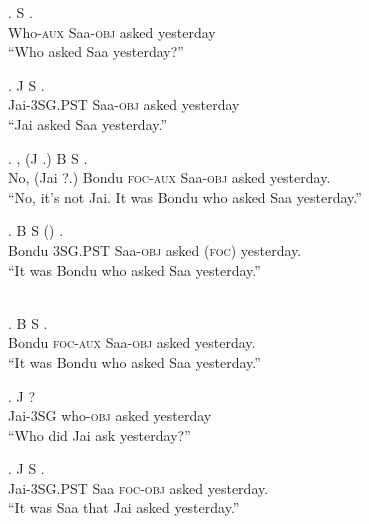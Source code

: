 \documentclass{assets/fieldnotes}
\begin{document}
\exg.  S  .\\
Who-\textsc{aux} Saa-\textsc{obj} asked yesterday\\
``Who asked Saa yesterday?''

\exg. J S  .\\
Jai-\textsc{3SG.PST} Saa-\textsc{obj} asked yesterday\\
``Jai asked Saa yesterday.''

\exg. , (J .) B  S  .\\
No, (Jai ?.) Bondu \textsc{foc-aux} Saa-\textsc{obj} asked yesterday.\\
``No, it's not Jai. It was Bondu who asked Saa yesterday.''

\exg. B  S  () .\\
Bondu \textsc{3SG.PST} Saa-\textsc{obj} asked (\textsc{foc}) yesterday.\\
``It was Bondu who asked Saa yesterday.''\\
\\

\exg. B  S  .\\
Bondu \textsc{foc-aux} Saa-\textsc{obj} asked yesterday.\\
``It was Bondu who asked Saa yesterday.''\\

\exg. J   ?\\
Jai-\textsc{3SG} who-\textsc{obj} asked yesterday\\
``Who did Jai ask yesterday?''

\exg. J S   .\\
Jai-\textsc{3SG.PST} Saa \textsc{foc-obj} asked yesterday.\\
``It was Saa that Jai asked yesterday.''
\end{document}
